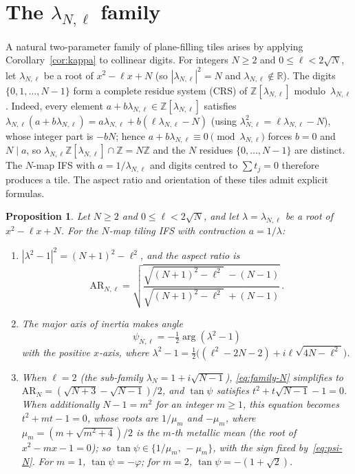 \documentclass{amsart}
\newtheorem{proposition}[theorem]{Proposition}
\theoremstyle{definition}
\theoremstyle{remark}
\begin{document}
\section{The \texorpdfstring{$\lambda_{N,\ell}$}{λ\_{N,ℓ}} family}\label{sec:family-N}

A natural two-parameter family of plane-filling tiles arises
by applying Corollary~\ref{cor:kappa} to collinear digits.
For integers $N\geq 2$ and $0 \leq \ell < 2\sqrt{N}$, let
$\lambda_{N,\ell}$ be a root of $x^2-\ell x+N$
(so $|\lambda_{N,\ell}|^2=N$ and $\lambda_{N,\ell}\notin\mathbb{R}$).
The digits $\{0,1,\ldots,N\!-\!1\}$ form a complete residue system (CRS) of
$\mathbb{Z}[\lambda_{N,\ell}]$ modulo~$\lambda_{N,\ell}$
\cite{Kenyon1992, LagariasWang1996}.
Indeed, every element $a+b\lambda_{N,\ell}\in\mathbb{Z}[\lambda_{N,\ell}]$
satisfies $\lambda_{N,\ell}(a+b\lambda_{N,\ell})
= a\lambda_{N,\ell}+b(\ell\lambda_{N,\ell}-N)$
(using $\lambda_{N,\ell}^2=\ell\lambda_{N,\ell}-N$),
whose integer part is $-bN$;
hence $a+b\lambda_{N,\ell}\equiv 0\pmod{\lambda_{N,\ell}}$ forces
$b=0$ and $N\mid a$, so
$\lambda_{N,\ell}\mathbb{Z}[\lambda_{N,\ell}]\cap\mathbb{Z}=N\mathbb{Z}$
and the $N$ residues $\{0,\ldots,N\!-\!1\}$ are distinct.
The $N$-map IFS with $a=1/\lambda_{N,\ell}$ and digits centred
to $\sum t_j=0$ therefore produces a tile.
The aspect ratio and orientation of these tiles
admit explicit formulas.

\begin{proposition}\label{prop:family-N}
Let $N\geq 2$ and $0 \leq \ell < 2\sqrt{N}$, and let $\lambda = \lambda_{N,\ell}$
be a root of $x^2-\ell x+N$.
For the $N$-map tiling IFS with contraction $a = 1/\lambda$:
\begin{enumerate}[{\upshape (i)}]
\item $|\lambda^2-1|^2 = (N+1)^2 - \ell^2$, and the aspect ratio is
\begin{equation}\label{eq:family-N}
  \mathrm{AR}_{N,\ell}
  = \sqrt{\frac{\sqrt{(N+1)^2-\ell^2}\;-(N-1)}
               {\sqrt{(N+1)^2-\ell^2}\;+(N-1)}}\,.
\end{equation}
\item The major axis of inertia makes angle
\begin{equation}\label{eq:psi-N}
  \psi_{N,\ell}
  = -\tfrac{1}{2}\arg(\lambda^2-1)
\end{equation}
with the positive $x$-axis, where
$\lambda^2-1 = \tfrac{1}{2}\bigl((\ell^2\!-\!2N\!-\!2) + i\ell\sqrt{4N-\ell^2}\bigr)$.
\item When $\ell=2$ \textup{(}the sub-family
$\lambda_N = 1+i\sqrt{N\!-\!1}$\textup{)},
\eqref{eq:family-N} simplifies to
$\mathrm{AR}_N = (\sqrt{N+3}-\sqrt{N-1})/2$,
and $\tan\psi$ satisfies $t^2+t\sqrt{N\!-\!1}-1=0$.
When additionally $N\!-\!1=m^2$ for an integer $m\geq 1$, this equation
becomes $t^2+mt-1=0$, whose roots are $1/\mu_m$ and $-\mu_m$,
where $\mu_m=(m+\sqrt{m^2+4})/2$ is the $m$-th metallic mean
\textup{(}the root of $x^2-mx-1=0$\textup{)};
so $\tan\psi\in\{1/\mu_m,\,-\mu_m\}$, with the sign fixed by~\eqref{eq:psi-N}.
For $m=1$, $\tan\psi=-\varphi$; for $m=2$, $\tan\psi=-(1+\sqrt{2})$.
\end{enumerate}
\end{proposition}
\end{document}
